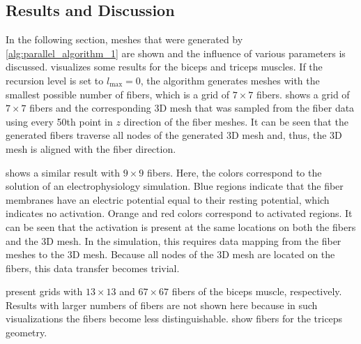 \subsection{Results and Discussion}

In the following section, meshes that were generated by \cref{alg:parallel_algorithm_1} are shown and the influence of various parameters is discussed.
 visualizes some results for the biceps and triceps muscles. If the recursion level is set to $l_\text{max}=0$, the algorithm generates meshes with the smallest possible number of fibers, which is a grid of $7 \times 7$ fibers.  
 shows a grid of $7\times 7$ fibers and the corresponding 3D mesh that was sampled from the fiber data using every 50th point in $z$ direction of the fiber meshes. It can be seen that the generated fibers traverse all nodes of the generated 3D mesh and, thus, the 3D mesh is aligned with the fiber direction.

 shows a similar result with $9 \times 9$ fibers. Here, the colors correspond to the solution of an electrophysiology simulation. Blue regions indicate that the fiber membranes have an electric potential equal to their resting potential, which indicates no activation. Orange and red colors correspond to activated regions. It can be seen that the activation is present at the same locations on both the fibers and the 3D mesh. In the simulation, this requires data mapping from the fiber meshes to the 3D mesh. Because all nodes of the 3D mesh are located on the fibers, this data transfer becomes trivial.

 present grids with $13 \times 13$ and $67 \times 67$ fibers of the biceps muscle, respectively. Results with larger numbers of fibers are not shown here because in such visualizations the fibers become less distinguishable.  show fibers for the triceps geometry.

